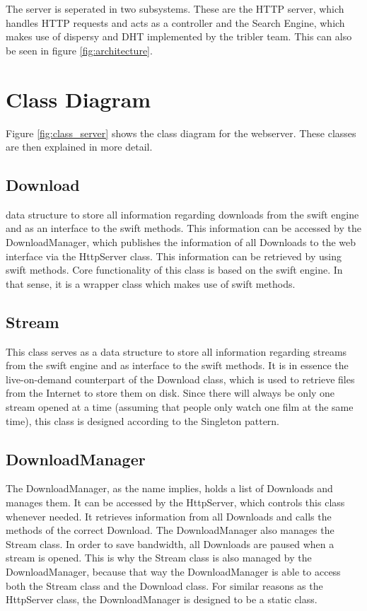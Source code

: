 The server is seperated in two subsystems. These are the HTTP server, which handles HTTP requests and acts as a controller and the Search Engine, 
which makes use of dispersy and DHT implemented by the tribler team. This can also be seen in figure \ref{fig:architecture}.


\section{Class Diagram}
Figure \ref{fig:class_server} shows the class diagram for the webserver. These classes are then explained in more detail.

\subsection{Download}
data structure to store all information regarding downloads from the swift engine and as an interface to the swift methods.
This information can be accessed by the DownloadManager, which publishes the information of all Downloads to the web interface via
the HttpServer class. This information can be retrieved by using swift methods. Core functionality of this class is based on the swift engine.
In that sense, it is a wrapper class which makes use of swift methods.

\subsection{Stream}
This class serves as a data structure to store all information regarding streams from the swift engine and as interface to the swift methods. It 
is in essence the live-on-demand counterpart of the Download class, which is used to retrieve files from the Internet to store them on disk.
Since there will always be only one stream opened at a time (assuming that people only watch one film at the same time),
this class is designed according to the Singleton pattern.

\subsection{DownloadManager}
The DownloadManager, as the name implies, holds a list of Downloads and manages them. It can be accessed by the HttpServer, which controls this
class whenever needed. It retrieves information from all Downloads and calls the methods of the correct Download. The DownloadManager also manages
 the Stream class. In order to save bandwidth, all Downloads are paused when a stream is opened. This is why the Stream class is also managed by
 the DownloadManager, because that way the DownloadManager is able to access both the Stream class and the Download class. For similar reasons as
 the HttpServer class, the DownloadManager is designed to be a static class.

